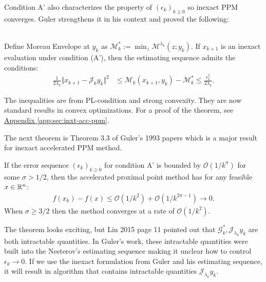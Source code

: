 \documentclass[12pt]{article}
\begin{document}
    Condition A' also characterizes the property of $(\epsilon_k)_{k\ge 0}$ so inexact PPM converges. 
    Guler strengthens it in his context and proved the following: 
    \begin{theorem}\label{thm:guler-inexact-ppm-bound}
        \;\\
        Define Moreau Envelope at $y_k$ as $\mathcal M_k^* := \min_z \mathcal {M}^{\lambda_k}(z; y_k)$. 
        If $x_{k +1}$ is an inexact evaluation under condition (A'), then the estimating sequence admits the conditions: 
        \begin{align*}
            \frac{1}{2\lambda_k} \Vert x_{k + 1} - \mathcal J_k y_k\Vert^2
            &\le 
            \mathcal M_k(x_{k + 1}, y_k) - \mathcal M^*_k
            \le \frac{\epsilon_k^2}{2\lambda_k}. 
        \end{align*}
    \end{theorem}
    \begin{remark}
        The inequalities are from PL-condition and strong convexity. 
        They are now standard results in convex optimizations. 
        For a proof of the theorem, see 
        \hyperref[app:sec:inxt-acc-ppm]{Appendix \ref*{app:sec:inxt-acc-ppm}}. 
    \end{remark}
    The next theorem is Theorem 3.3 of Guler's 1993 papers which is a major result for inexact accelerated PPM method. 
    \begin{theorem}
        If the error sequence $(\epsilon_k)_{k \ge0}$ for condition A' is bounded by $\mathcal O(1/k^\sigma)$ for some $\sigma > 1/2$, then the accelerated proximal point method has for any feasible $x \in \mathbb R^n$: 
        \begin{align*}
            f(x_k) - f(x) \le \mathcal O(1/k^2) + \mathcal O (1 / k^{2\sigma - 1})\rightarrow 0. 
        \end{align*}    
        When $\sigma \ge 3/2$ then the method converges at a rate of $\mathcal O(1/k^2)$. 
    \end{theorem}
    The theorem looks exciting, but Lin 2015 \cite{lin_universal_2015} page 11 pointed out that $\mathcal G_k^*, \mathcal J_{\lambda_k} y_k$ are both intractable quantities. 
    In Guler's work, these intractable quantities were built into the Nesterov's estimating sequence making it unclear how to control $\epsilon_k \rightarrow 0$. 
    If we use the inexact formulation from Guler and his estimating sequence, it will result in algorithm that contains intractable quantities $\mathcal J_{\lambda_k} y_k$. 
\end{document}
